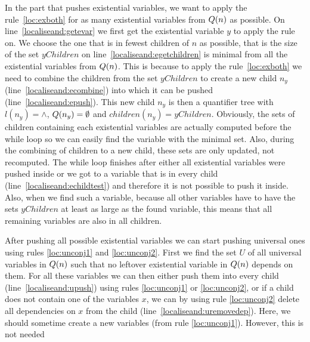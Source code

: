 \documentclass[
  digital, %
  twoside, %
  table,   %
  nolof,     %
  nolot,     %
]{fithesis3}
\theoremstyle{definition}
\theoremstyle{remark}
\begin{document}
In the part that pushes existential variables, we want to apply the rule~\eqref{loc:exboth} for as many existential variables from $Q({n})$ as possible. On line~\ref{localiseand:getevar} we first get the existential variable $y$ to apply the rule on. We choose the one that is in fewest children of $n$ as possible, that is the size of the set $yChildren$ on line~\ref{localiseand:egetchildren} is minimal from all the existential variables from $Q({n})$. This is because to apply the rule~\eqref{loc:exboth} we need to combine the children from the set $yChildren$ to create a new child $n_y$ (line~\ref{localiseand:ecombine}) into which it can be pushed (line~\ref{localiseand:epush}). This new child $n_y$ is then a quantifier tree with $l(n_y) = {\land}$, $Q({n_y}) = \emptyset$ and $children(n_y) = yChildren$. Obviously, the sets of children containing each existential variables are actually computed before the while loop so we can easily find the variable with the minimal set. Also, during the combining of children to a new child, these sets are only updated, not recomputed. The while loop finishes after either all existential variables were pushed inside or we got to a variable that is in every child (line~\ref{localiseand:echildtest}) and therefore it is not possible to push it inside. Also, when we find such a variable, because all other variables have to have the sets $yChildren$ at least as large as the found variable, this means that all remaining variables are also in all children.

After pushing all possible existential variables we can start pushing universal ones using rules \eqref{loc:unconj1} and \eqref{loc:unconj2}. First we find the set $U$ of all universal variables in $Q({n})$ such that no leftover existential variable in $Q({n})$ depends on them. For all these variables we can then either push them into every child (line~\ref{localiseand:upush}) using rules \eqref{loc:unconj1} or \eqref{loc:unconj2}, or if a child does not contain one of the variables $x$, we can by using rule \eqref{loc:unconj2} delete all dependencies on $x$ from the child (line~\ref{localiseand:uremovedep}). Here, we should sometime create a new variables (from rule \eqref{loc:unconj1}). However, this is not needed%


\end{document}

